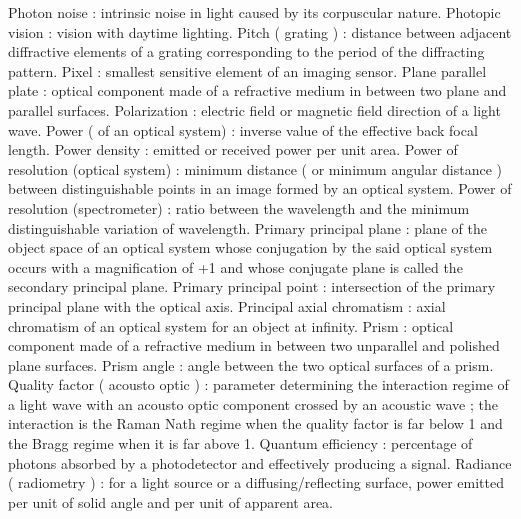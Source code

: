 Photon noise                                         : intrinsic noise in light caused by its corpuscular nature.
Photopic vision                                      : vision with daytime lighting.
Pitch ( grating )                                    : distance between adjacent diffractive elements of a grating corresponding to the period of the diffracting pattern.
Pixel                                                : smallest sensitive element of an imaging sensor.
Plane parallel plate                                 : optical component made of a refractive medium in between two plane and parallel surfaces.
Polarization                                         : electric field or magnetic field direction of a light wave.
Power ( of an optical system)                        : inverse value of the effective back focal length.
Power density                                        : emitted or received power per unit area.
Power of resolution (optical system)                 : minimum distance ( or minimum angular distance ) between distinguishable points in an image formed by an optical system.
Power of resolution (spectrometer)                   : ratio between the wavelength and the minimum distinguishable variation of wavelength.
Primary principal plane                              : plane of the object space of an optical system whose conjugation by the said optical system occurs with a magnification of +1 and whose conjugate plane is called the secondary principal plane.
Primary principal point                              : intersection of the primary principal plane with the optical axis.
Principal axial chromatism                           : axial chromatism of an optical system for an object at infinity.
Prism                                                : optical component made of a refractive medium in between two unparallel and polished plane surfaces.
Prism angle                                          : angle between the two optical surfaces of a prism.
Quality factor ( acousto optic )                     : parameter determining the interaction regime of a light wave with an acousto optic component crossed by an acoustic wave ; the interaction is the Raman Nath regime when the quality factor is far below 1 and the Bragg regime when it is far above 1.
Quantum efficiency                                   : percentage of photons absorbed by a photodetector and effectively producing a signal.
Radiance ( radiometry )                              : for a light source or a diffusing/reflecting surface, power emitted per unit of solid angle and per unit of apparent area.
